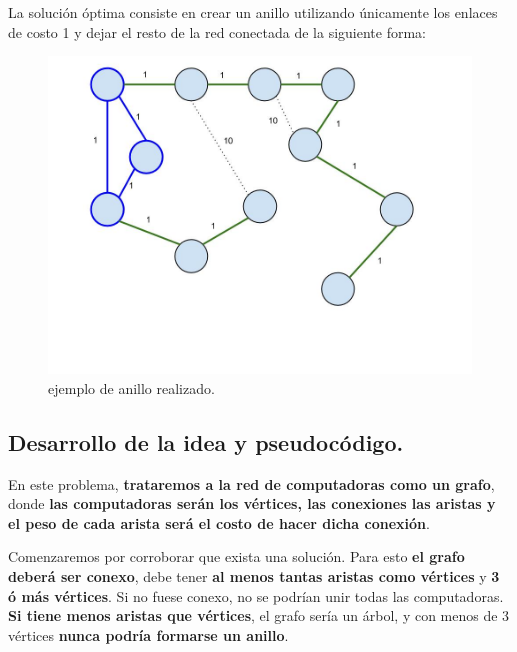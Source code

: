 \vspace*{0.5cm}

La solución óptima consiste en crear un anillo utilizando únicamente los
enlaces de costo 1 y dejar el resto de la red conectada de la siguiente
forma:

\begin{figure}[htb]
  \begin{center}
      \includegraphics[scale=0.25]{imagenes/anillo-hecho.jpg}
  \end{center}
  \caption{ejemplo de anillo realizado.}
\end{figure}


\newpage
\subsection{Desarrollo de la idea y pseudocódigo.}

\vspace*{0.3cm}

En este problema, \textbf{trataremos a la red de computadoras como un grafo},
donde \textbf{las computadoras serán los vértices, las conexiones las aristas
y el peso de cada arista será el costo de hacer dicha conexión}.

Comenzaremos por corroborar que exista una solución. Para esto \textbf{el
grafo deberá ser conexo}, debe tener \textbf{al menos tantas aristas como
vértices} y \textbf{3 ó más vértices}. Si no fuese conexo, no se podrían
unir todas las computadoras. \textbf{Si tiene menos aristas que vértices},
el grafo sería un árbol, y con menos de 3 vértices \textbf{nunca podría formarse
un anillo}.

